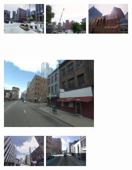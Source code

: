 \begin{figure}[t!]
\begin{minipage}{0.75\linewidth}
\begin{minipage}{\linewidth}
                \colorbox{myGreen}{\includegraphics[height=16mm]{imgs/ex3/FV2.jpg}}
                \colorbox{myRed}{\includegraphics[height=16mm]{imgs/ex3/FV3.jpg}}
                \colorbox{myRed}{\includegraphics[height=16mm]{imgs/ex3/FV4.jpg}}
            \end{minipage} 
        \end{minipage}
        \vspace{3mm}
        \\
        \begin{minipage}{0.34\linewidth}
            \centering
            \vspace{0mm}
            \includegraphics[height=36mm]{imgs/ex4/query.jpg}
        \end{minipage}
        \begin{minipage}{0.75\linewidth}
            \begin{minipage}{\linewidth} 
                \colorbox{myGreen}{\includegraphics[height=16mm]{imgs/ex4/FVsvm1.jpg}}
                \colorbox{myRed}{\includegraphics[height=16mm]{imgs/ex4/FVsvm2.jpg}}

\end{minipage}
\end{minipage}
\end{figure}
